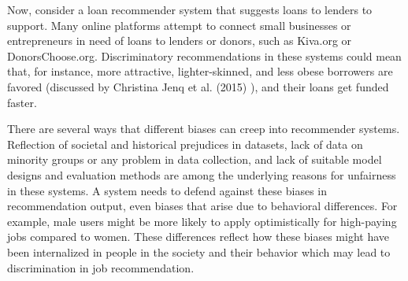 

Now, consider a loan recommender system that suggests loans to lenders to support. Many online platforms attempt to connect small businesses or entrepreneurs in need of loans to lenders or donors, such as Kiva.org or DonorsChoose.org. Discriminatory recommendations in these systems could mean that, for instance, more attractive, lighter-skinned, and less obese borrowers are favored (discussed by Christina Jenq et al. (2015) \cite{JENQ2015234}), and their loans get funded faster.

There are several ways that different biases can creep into recommender systems. Reflection of societal and historical prejudices in datasets, lack of data on minority groups or any problem in data collection, and lack of suitable model designs and evaluation methods are among the underlying reasons for unfairness in these systems. A system needs to defend against these biases in recommendation output, even biases that arise due to behavioral differences. For example, male users might be more likely to apply optimistically for high-paying jobs compared to women. These differences reflect how these biases might have been internalized in people in the society and their behavior which may lead to discrimination in job recommendation. 




